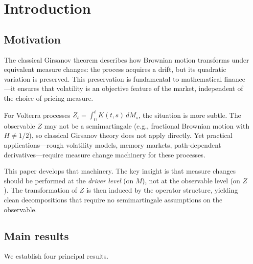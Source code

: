 \documentclass[11pt]{article}
\theoremstyle{plain}
\theoremstyle{definition}
\theoremstyle{remark}
\begin{document}
\tableofcontents

\section{Introduction}\label{sec:intro}

\subsection{Motivation}

The classical Girsanov theorem describes how Brownian motion transforms under
equivalent measure changes: the process acquires a drift, but its quadratic
variation is preserved. This preservation is fundamental to mathematical
finance---it ensures that volatility is an objective feature of the market,
independent of the choice of pricing measure.

For Volterra processes $Z_t = \int_0^t K(t,s)\,dM_s$, the situation is more
subtle. The observable $Z$ may not be a semimartingale (e.g., fractional
Brownian motion with $H \ne 1/2$), so classical Girsanov theory does not
apply directly. Yet practical applications---rough volatility models, memory
markets, path-dependent derivatives---require measure change machinery for
these processes.

This paper develops that machinery. The key insight is that measure changes
should be performed at the \emph{driver level} (on $M$), not at the observable
level (on $Z$). The transformation of $Z$ is then induced by the operator
structure, yielding clean decompositions that require no semimartingale
assumptions on the observable.

\subsection{Main results}

We establish four principal results.
\end{document}
